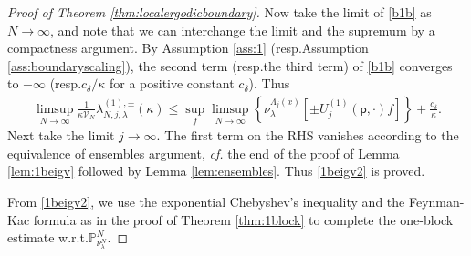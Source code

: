 \documentclass[11pt]{amsart}
\theoremstyle{plain}
\theoremstyle{definition}
\theoremstyle{remark}
\begin{document}
\begin{proof}[Proof of Theorem \ref{thm:localergodicboundary}]
Now take the limit of \eqref{b1b} as $N\to\infty$, and note that we can interchange the limit and the supremum by a compactness argument. By Assumption \ref{ass:1} (resp.\@ Assumption \ref{ass:boundaryscaling}), the second term (resp.\@ the third term) of \eqref{b1b} converges to $-\infty$ (resp.\@ $c_\delta/\kappa$ for a positive constant $c_\delta$). Thus
\begin{align*}
\limsup_{N\to\infty} \frac{1}{\kappa \mathcal{V}_N} \lambda^{(1),\pm}_{N,j,\lambda}(\kappa) \leq \sup_f \limsup_{N\to\infty}\left\{\nu_\lambda^{\Lambda_j(x)}\left[\pm {U^{(1)}_{{{j}}}}({\mathsf{p}},\cdot)f\right] \right\} + \frac{c_\delta}{\kappa}.
\end{align*}
Next take the limit $j\to\infty$. The first term on the RHS vanishes according to the equivalence of ensembles argument, \emph{cf.\@} the end of the proof of Lemma \ref{lem:1beigv} followed by Lemma \ref{lem:ensembles}. Thus \eqref{1beigv2} is proved. 

From \eqref{1beigv2}, we use the exponential Chebyshev's inequality and the Feynman-Kac formula as in the proof of Theorem \ref{thm:1block} to complete the one-block estimate w.r.t.\@ $\mathbb{P}^N_{\nu^N_\lambda}$.


\end{proof}
\end{document}
